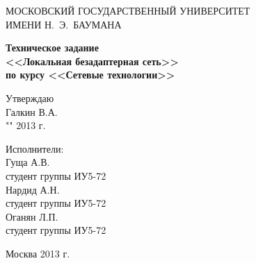 \documentclass[14pt]{extarticle}
\begin{document}
\begin{singlespace}
\thispagestyle{empty}
\begin{center}
МОСКОВСКИЙ ГОСУДАРСТВЕННЫЙ УНИВЕРСИТЕТ\\ ИМЕНИ Н.~Э.~БАУМАНА\\[0.5cm]
\end{center}


\vspace{4.5cm}

\begin{center}
\textbf{
\LARGE{Техническое задание}\\
<<Локальная безадаптерная сеть>>\\
по курсу <<Сетевые технологии>> \\[0.5cm]
}
\end{center}

\vspace{0.7cm}

\begin{flushright}
\begin{minipage}{6cm}
Утверждаю\\
\underline{\hspace{2cm}} Галкин В.А.\\
"\underline{\hspace{0.5cm}}"\underline{\hspace{1.5cm}} 2013 г.\\[0.5cm]
\end{minipage}
\end{flushright}


\begin{flushright}
\begin{minipage}{6cm}
Исполнители:\\
Гуща А.В.\\
студент группы ИУ5-72\\ [0.2cm] 

Нардид А.Н. \\
студент группы ИУ5-72\\ [0.2cm]

Оганян Л.П. \\
студент группы ИУ5-72\\ [0.2cm]
\end{minipage}
\end{flushright}

\vspace{2.5cm}

\begin{center}
Москва 2013 г.
\end{center}

\end{singlespace}
\end{document}
